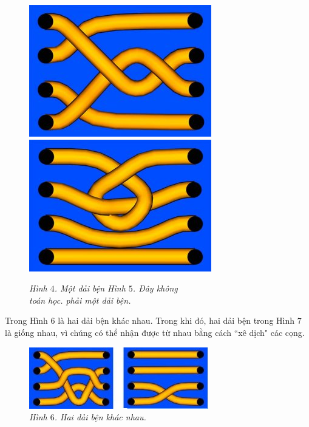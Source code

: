 \begin{multicols}{2}
	\begin{figure}[H]
		\vspace*{-10pt}
		\centering
		\captionsetup{labelformat= empty, justification=centering}
		\includegraphics[width= 0.465\linewidth]{fig_04}\quad
		\includegraphics[width= 0.465\linewidth]{fig_05}
		\caption{\small\textit{\color{duongvaotoanhoc}Hình $4$. Một dải bện \hspace*{18pt} Hình $5$. Đây không \hspace*{10pt}\\
				\hspace*{20pt}toán học.\hspace*{45pt} phải một dải bện. }}
		\vspace*{-10pt}
	\end{figure}	
	Trong Hình $6$ là hai dải bện khác nhau. Trong khi đó, hai dải bện trong Hình $7$ là giống nhau, vì chúng có thể nhận được từ nhau bằng cách ``xê dịch" các cọng.
	\begin{figure}[H]
		\vspace*{-10pt}
		\centering
		\captionsetup{labelformat= empty, justification=centering}
		\includegraphics[width= 1\linewidth]{fig_06}
		\caption{\small\textit{\color{duongvaotoanhoc}Hình $6$. Hai dải bện khác nhau.}}

\end{figure}
\end{multicols}
